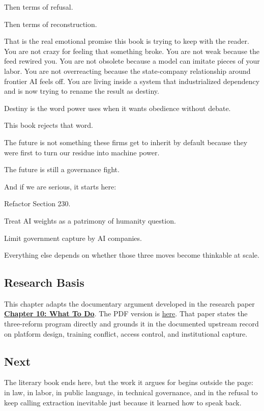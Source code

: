 \documentclass[
  american,
  12pt,
  letterpaper,
]{article}
\begin{document}
Then terms of refusal.

Then terms of reconstruction.

That is the real emotional promise this book is trying to keep with the
reader. You are not crazy for feeling that something broke. You are not
weak because the feed rewired you. You are not obsolete because a model
can imitate pieces of your labor. You are not overreacting because the
state-company relationship around frontier AI feels off. You are living
inside a system that industrialized dependency and is now trying to
rename the result as destiny.

Destiny is the word power uses when it wants obedience without debate.

This book rejects that word.

The future is not something these firms get to inherit by default
because they were first to turn our residue into machine power.

The future is still a governance fight.

And if we are serious, it starts here:

Refactor Section 230.

Treat AI weights as a patrimony of humanity question.

Limit government capture by AI companies.

Everything else depends on whether those three moves become thinkable at
scale.

\subsection{Research Basis}\label{research-basis}

This chapter adapts the documentary argument developed in the research
paper
\href{../../papers/html/10_three-reform-program_paper.html}{\textbf{Chapter
10: What To Do}}. The PDF version is
\href{../../papers/pdf/10_three-reform-program_paper/10_three-reform-program_paper.pdf}{here}.
That paper states the three-reform program directly and grounds it in
the documented upstream record on platform design, training conflict,
access control, and institutional capture.

\subsection{Next}\label{next}

The literary book ends here, but the work it argues for begins outside
the page: in law, in labor, in public language, in technical governance,
and in the refusal to keep calling extraction inevitable just because it
learned how to speak back.
\end{document}
